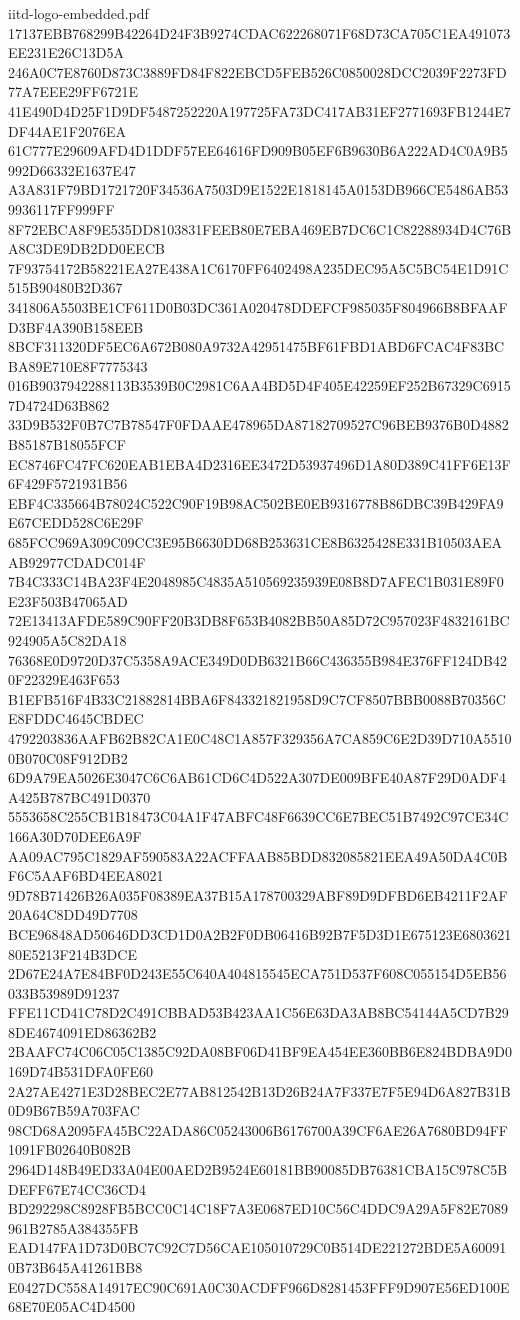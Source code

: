 \begin{filecontents*}[overwrite]{iitd-logo-embedded.pdf}
17137EBB768299B42264D24F3B9274CDAC622268071F68D73CA705C1EA491073EE231E26C13D5A
246A0C7E8760D873C3889FD84F822EBCD5FEB526C0850028DCC2039F2273FD77A7EEE29FF6721E
41E490D4D25F1D9DF5487252220A197725FA73DC417AB31EF2771693FB1244E7DF44AE1F2076EA
61C777E29609AFD4D1DDF57EE64616FD909B05EF6B9630B6A222AD4C0A9B5992D66332E1637E47
A3A831F79BD1721720F34536A7503D9E1522E1818145A0153DB966CE5486AB539936117FF999FF
8F72EBCA8F9E535DD8103831FEEB80E7EBA469EB7DC6C1C82288934D4C76BA8C3DE9DB2DD0EECB
7F93754172B58221EA27E438A1C6170FF6402498A235DEC95A5C5BC54E1D91C515B90480B2D367
341806A5503BE1CF611D0B03DC361A020478DDEFCF985035F804966B8BFAAFD3BF4A390B158EEB
8BCF311320DF5EC6A672B080A9732A42951475BF61FBD1ABD6FCAC4F83BCBA89E710E8F7775343
016B9037942288113B3539B0C2981C6AA4BD5D4F405E42259EF252B67329C69157D4724D63B862
33D9B532F0B7C7B78547F0FDAAE478965DA87182709527C96BEB9376B0D4882B85187B18055FCF
EC8746FC47FC620EAB1EBA4D2316EE3472D53937496D1A80D389C41FF6E13F6F429F5721931B56
EBF4C335664B78024C522C90F19B98AC502BE0EB9316778B86DBC39B429FA9E67CEDD528C6E29F
685FCC969A309C09CC3E95B6630DD68B253631CE8B6325428E331B10503AEAAB92977CDADC014F
7B4C333C14BA23F4E2048985C4835A510569235939E08B8D7AFEC1B031E89F0E23F503B47065AD
72E13413AFDE589C90FF20B3DB8F653B4082BB50A85D72C957023F4832161BC924905A5C82DA18
76368E0D9720D37C5358A9ACE349D0DB6321B66C436355B984E376FF124DB420F22329E463F653
B1EFB516F4B33C21882814BBA6F843321821958D9C7CF8507BBB0088B70356CE8FDDC4645CBDEC
4792203836AAFB62B82CA1E0C48C1A857F329356A7CA859C6E2D39D710A55100B070C08F912DB2
6D9A79EA5026E3047C6C6AB61CD6C4D522A307DE009BFE40A87F29D0ADF4A425B787BC491D0370
5553658C255CB1B18473C04A1F47ABFC48F6639CC6E7BEC51B7492C97CE34C166A30D70DEE6A9F
AA09AC795C1829AF590583A22ACFFAAB85BDD832085821EEA49A50DA4C0BF6C5AAF6BD4EEA8021
9D78B71426B26A035F08389EA37B15A178700329ABF89D9DFBD6EB4211F2AF20A64C8DD49D7708
BCE96848AD50646DD3CD1D0A2B2F0DB06416B92B7F5D3D1E675123E680362180E5213F214B3DCE
2D67E24A7E84BF0D243E55C640A404815545ECA751D537F608C055154D5EB56033B53989D91237
FFE11CD41C78D2C491CBBAD53B423AA1C56E63DA3AB8BC54144A5CD7B298DE4674091ED86362B2
2BAAFC74C06C05C1385C92DA08BF06D41BF9EA454EE360BB6E824BDBA9D0169D74B531DFA0FE60
2A27AE4271E3D28BEC2E77AB812542B13D26B24A7F337E7F5E94D6A827B31B0D9B67B59A703FAC
98CD68A2095FA45BC22ADA86C05243006B6176700A39CF6AE26A7680BD94FF1091FB02640B082B
2964D148B49ED33A04E00AED2B9524E60181BB90085DB76381CBA15C978C5BDEFF67E74CC36CD4
BD292298C8928FB5BCC0C14C18F7A3E0687ED10C56C4DDC9A29A5F82E7089961B2785A384355FB
EAD147FA1D73D0BC7C92C7D56CAE105010729C0B514DE221272BDE5A600910B73B645A41261BB8
E0427DC558A14917EC90C691A0C30ACDFF966D8281453FFF9D907E56ED100E68E70E05AC4D4500

\end{filecontents*}
